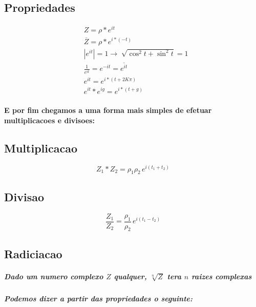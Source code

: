 \documentclass[12pt,twoside, a4paper, twocolumn]{article}
\begin{document}
\subsection{Propriedades}
\begin{equation*}
    \begin{aligned}
         & Z             = \rho * e^{it}                                         \\
         & \overline{Z}  = \rho * e^{i * \left(-t\right)}                        \\
         & | e^{it} |    = 1      \rightarrow \sqrt[]{\cos^2{t} + \sin^2{t}} = 1 \\
         & \frac{1}{e^{it}  } = e^{-it} = \overline{e^{it}  }                    \\
         & e^{it}  = e^{i*(t+2K\pi)}                                             \\
         & e^{it}  * e^{ig} = e^{i* (t+g)}
    \end{aligned}
\end{equation*}

\paragraph*{E por fim chegamos a uma forma mais simples de efetuar multiplicacoes e divisoes:}

\subsection{Multiplicacao}
\begin{equation}
    Z_1 * Z_2  = \rho_1  \rho_2 \, e^{i(t_1 + t_2)}
\end{equation}
\subsection{Divisao}
\begin{equation}
    \frac{Z_1}{Z_2}  = \frac{\rho_1  }{\rho_2}  \, e^{i(t_1 - t_2)}
\end{equation}

\subsection{Radiciacao}
\subparagraph*{Dado um numero complexo $Z$ qualquer,  $\sqrt[n]{Z}$ tera $n$ raizes complexas }

\subparagraph*{Podemos dizer a partir das propriedades o seguinte:}
\end{document}
